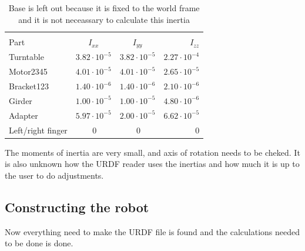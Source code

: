 \begin{table}[htbp]
\centering
\caption{Base is left out because it is fixed to the world frame and it is not neceassary to calculate this inertia}
\label{table:inertia}
    \begin{tabular}{l c c r}
        \hline \\[-1em]
        Part  &  $I_{xx}$ & $I_{yy}$ & $I_{zz}$\\
        \hline
        Turntable & $3.82\cdot10^{-5}$ &  $3.82\cdot10^{-5}$ &$2.27\cdot10^{-4}$\\
        Motor2345 & $4.01\cdot10^{-5}$  & $4.01\cdot10^{-5}$  & $2.65\cdot10^{-5}$ \\
        Bracket123 & $1.40\cdot10^{-6} $ & $1.40\cdot10^{-6} $ & $2.10\cdot10^{-6} $ \\
        Girder & $1.00\cdot10^{-5} $ & $1.00\cdot10^{-5} $ & $4.80\cdot10^{-6} $\\
        Adapter & $5.97\cdot10^{-5} $ & $2.00\cdot10^{-5} $ & $6.62\cdot10^{-5} $\\
        Left/right finger & $~0$ & $~0$ & $~0$\\
        \hline
    \end{tabular}
\end{table}

The moments of inertia are very small, and axis of rotation needs to be cheked. It is also unknown how the URDF reader uses the inertias and how much it is up to the user to do adjustments. 

\subsection*{Constructing the robot}
Now everything need to make the URDF file is found and the calculations needed to be done is done. 









